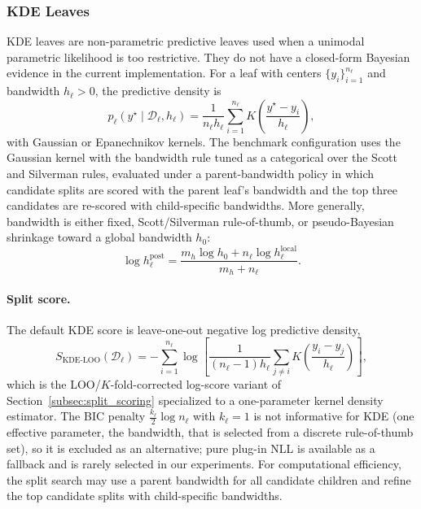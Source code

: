 \documentclass[10pt]{article} %
\begin{document}
\subsubsection{KDE Leaves}\label{app:kde_leaves}

KDE leaves are non-parametric predictive leaves used when a unimodal parametric likelihood is too restrictive. They do not have a closed-form Bayesian evidence in the current implementation.
For a leaf with centers $\{y_i\}_{i=1}^{n_\ell}$ and bandwidth $h_\ell>0$, the predictive density is
\begin{equation}\label{eq:kde_predictive}
p_\ell(y^\star\mid\mathcal{D}_\ell,h_\ell)
=
\frac{1}{n_\ell h_\ell}\sum_{i=1}^{n_\ell}
K\!\left(\frac{y^\star-y_i}{h_\ell}\right),
\end{equation}
with Gaussian or Epanechnikov kernels. The benchmark configuration uses the Gaussian kernel with the bandwidth rule tuned as a categorical over the Scott \citep{scott1992multivariate} and Silverman \citep{silverman1986density} rules, evaluated under a parent-bandwidth policy in which candidate splits are scored with the parent leaf's bandwidth and the top three candidates are re-scored with child-specific bandwidths. More generally, bandwidth is either fixed, Scott/Silverman rule-of-thumb, or pseudo-Bayesian shrinkage toward a global bandwidth $h_0$:
\begin{equation}\label{eq:kde_bandwidth_shrinkage}
\log h_\ell^{\mathrm{post}}
=
\frac{m_h\log h_0+n_\ell\log h_\ell^{\mathrm{local}}}{m_h+n_\ell}.
\end{equation}

\paragraph{Split score.}
The default KDE score is leave-one-out negative log predictive density,
\begin{equation}\label{eq:kde_loo}
S_{\mathrm{KDE\text{-}LOO}}(\mathcal{D}_\ell)
=
-\sum_{i=1}^{n_\ell}
\log\left[
\frac{1}{(n_\ell-1)h_\ell}
\sum_{j\ne i}
K\!\left(\frac{y_i-y_j}{h_\ell}\right)
\right],
\end{equation}
which is the LOO/$K$-fold-corrected log-score variant of Section~\ref{subsec:split_scoring} specialized to a one-parameter kernel density estimator. The BIC penalty $\tfrac{k_\ell}{2}\log n_\ell$ with $k_\ell=1$ is not informative for KDE (one effective parameter, the bandwidth, that is selected from a discrete rule-of-thumb set), so it is excluded as an alternative; pure plug-in NLL is available as a fallback and is rarely selected in our experiments. For computational efficiency, the split search may use a parent bandwidth for all candidate children and refine the top candidate splits with child-specific bandwidths.
\end{document}
